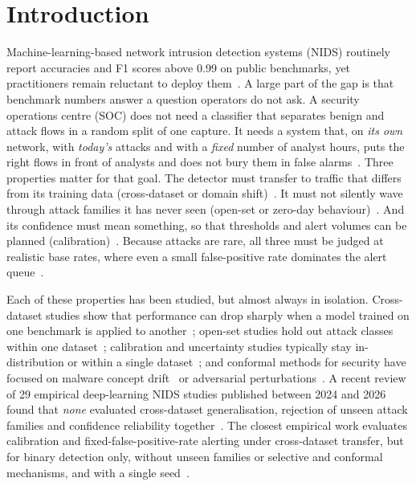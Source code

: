 \section{Introduction}\label{sec:intro}

Machine-learning-based network intrusion detection systems (NIDS) routinely report accuracies and F1 scores above 0.99 on public benchmarks, yet practitioners remain reluctant to deploy them~\cite{sommer2010outside,arp2022dos,apruzzese2023sok}. A large part of the gap is that benchmark numbers answer a question operators do not ask. A security operations centre (SOC) does not need a classifier that separates benign and attack flows in a random split of one capture. It needs a system that, on \emph{its own} network, with \emph{today's} attacks and with a \emph{fixed} number of analyst hours, puts the right flows in front of analysts and does not bury them in false alarms~\cite{alahmadi2022falsepositives}. Three properties matter for that goal. The detector must transfer to traffic that differs from its training data (cross-dataset or domain shift)~\cite{layeghy2023explainable,cantone2024cross}. It must not silently wave through attack families it has never seen (open-set or zero-day behaviour)~\cite{talpini2024enhancing,farrukh2023detecting}. And its confidence must mean something, so that thresholds and alert volumes can be planned (calibration)~\cite{guo2017calibration,pal2025calibrated}. Because attacks are rare, all three must be judged at realistic base rates, where even a small false-positive rate dominates the alert queue~\cite{axelsson2000base}.

Each of these properties has been studied, but almost always in isolation. Cross-dataset studies show that performance can drop sharply when a model trained on one benchmark is applied to another~\cite{layeghy2023explainable,cantone2024cross,xin2025crossdataset}; open-set studies hold out attack classes within one dataset~\cite{talpini2024enhancing,farrukh2023detecting,yu2025industrial}; calibration and uncertainty studies typically stay in-distribution or within a single dataset~\cite{pal2025calibrated}; and conformal methods for security have focused on malware concept drift~\cite{jordaney2017transcend,barbero2022transcending} or adversarial perturbations~\cite{li2026robust,yumlembam2024comprehensive}. A recent review of 29 empirical deep-learning NIDS studies published between 2024 and 2026 found that \emph{none} evaluated cross-dataset generalisation, rejection of unseen attack families and confidence reliability together~\cite{lew2026deployment}. The closest empirical work evaluates calibration and fixed-false-positive-rate alerting under cross-dataset transfer, but for binary detection only, without unseen families or selective and conformal mechanisms, and with a single seed~\cite{jin2026benchmark}.

